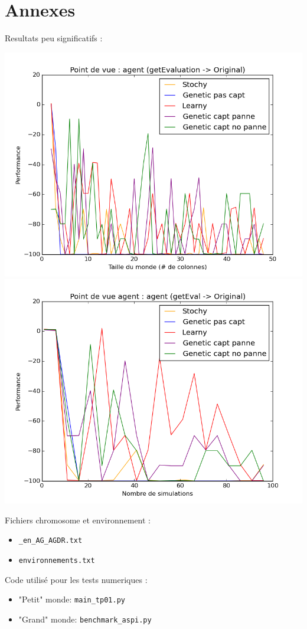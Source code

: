 \documentclass[12pt]{article}
\begin{document}
\section{Annexes}
\justify
Resultats peu significatifs : 
\begin{center}
\includegraphics[scale=0.5]{geteval_orig_tout}
\includegraphics[scale=0.5]{simu_geteval_orig_tout}
\end{center}
\justify
Fichiers chromosome et environnement : 
\begin{itemize}
\item \texttt{\_en\_AG\_AGDR.txt} 
\item \texttt{environnements.txt}
\end{itemize}
\justify
Code utilis\'e pour les tests numeriques :
\begin{itemize}
\item "Petit" monde: \texttt{main\_tp01.py}
\item "Grand" monde: \texttt{benchmark\_aspi.py} 
\end{itemize}
\end{document}
